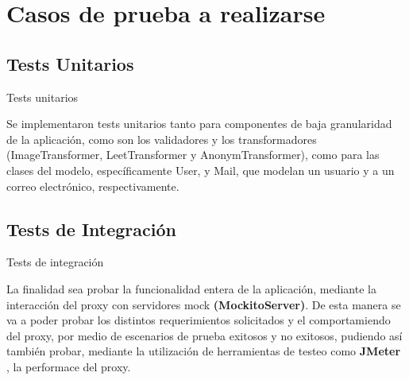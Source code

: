 \documentclass{beamer}
\begin{document}
\section{Casos de prueba a realizarse}

\subsection{Tests Unitarios}
\begin{frame}{Tests unitarios}
\par    Se implementaron tests unitarios tanto para componentes de baja granularidad de la aplicación, como son los validadores y los transformadores (ImageTransformer, LeetTransformer y AnonymTransformer), como para las clases del modelo, específicamente User, y Mail, que modelan un usuario y a un correo electrónico, respectivamente. 
\end{frame}

\subsection{Tests de Integración}
\begin{frame}{Tests de integración}
\par	La finalidad sea probar la funcionalidad entera de la aplicación, mediante la interacción del proxy con servidores mock \textbf{(MockitoServer)}. De esta manera se va a poder probar los distintos requerimientos solicitados y el comportamiendo del proxy, por medio de escenarios de prueba exitosos y no exitosos, pudiendo así también probar, mediante la utilización de herramientas de testeo como \textbf{JMeter} , la performace del proxy.
\end{frame}
\end{document}

